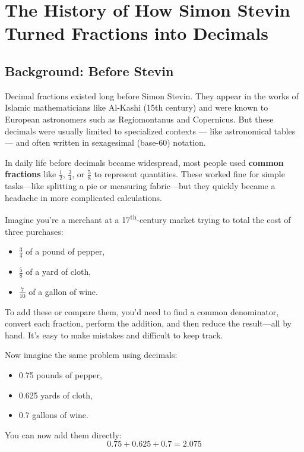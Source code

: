\section{The History of How Simon Stevin Turned Fractions into Decimals}

\subsection{Background: Before Stevin}

Decimal fractions existed long before Simon Stevin. They appear in the works of Islamic mathematicians like Al-Kashi (15th century) and were known to European astronomers such as Regiomontanus and Copernicus. But these decimals were usually limited to specialized contexts — like astronomical tables — and often written in sexagesimal (base-60) notation.

In daily life before decimals became widespread, most people used \textbf{common fractions} like \( \frac{1}{2} \), \( \frac{3}{4} \), or \( \frac{5}{8} \) to represent quantities. These worked fine for simple tasks—like splitting a pie or measuring fabric—but they quickly became a headache in more complicated calculations.

Imagine you're a merchant at a 17\textsuperscript{th}-century market trying to total the cost of three purchases:

\begin{itemize}
    \item \( \frac{3}{4} \) of a pound of pepper,
    \item \( \frac{5}{8} \) of a yard of cloth,
    \item \( \frac{7}{10} \) of a gallon of wine.
\end{itemize}

To add these or compare them, you'd need to find a common denominator, convert each fraction, perform the addition, and then reduce the result—all by hand. It's easy to make mistakes and difficult to keep track.

Now imagine the same problem using decimals:

\begin{itemize}
    \item 0.75 pounds of pepper,
    \item 0.625 yards of cloth,
    \item 0.7 gallons of wine.
\end{itemize}

You can now add them directly:
\[
0.75 + 0.625 + 0.7 = 2.075
\]

